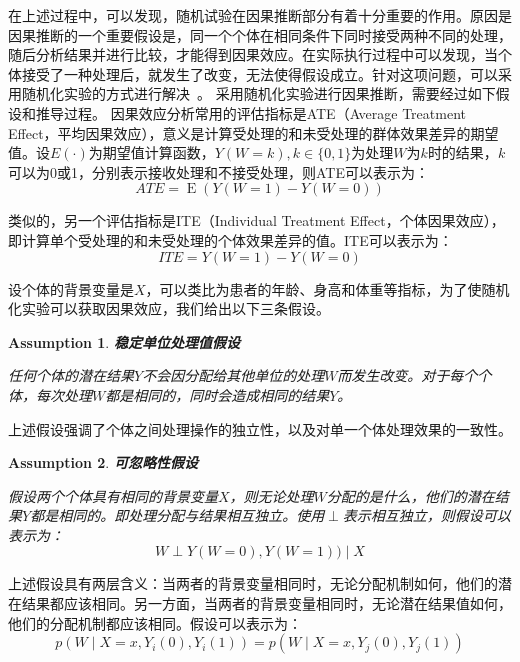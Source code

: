 \documentclass[algorithmlist, AutoFakeBold, AutoFakeSlant, figurelist, tablelist, nomlist, masters]{seuthesix}
\begin{document}
在上述过程中，可以发现，随机试验在因果推断部分有着十分重要的作用。原因是因果推断的一个重要假设是，同一个个体在相同条件下同时接受两种不同的处理，随后分析结果并进行比较，才能得到因果效应。在实际执行过程中可以发现，当个体接受了一种处理后，就发生了改变，无法使得假设成立。针对这项问题，可以采用随机化实验的方式进行解决~\cite{yao2021survey}。
采用随机化实验进行因果推断，需要经过如下假设和推导过程。
因果效应分析常用的评估指标是ATE（Average Treatment Effect，平均因果效应），意义是计算受处理的和未受处理的群体效果差异的期望值。设$E(\cdot)$为期望值计算函数，$Y(W=k), k \in \{0, 1\}$为处理$W$为$k$时的结果，$k$可以为0或1，分别表示接收处理和不接受处理，则ATE可以表示为：
\begin{equation}
  ATE=\operatorname{E}\left(Y(W=1) - Y(W=0)\right)
  \label{equation_ATE}
\end{equation}

类似的，另一个评估指标是ITE（Individual Treatment Effect，个体因果效应），即计算单个受处理的和未受处理的个体效果差异的值。ITE可以表示为：
\begin{equation}
  ITE=Y(W=1) - Y(W=0)
  \label{equation_ITE}
\end{equation}

设个体的背景变量是$X$，可以类比为患者的年龄、身高和体重等指标，为了使随机化实验可以获取因果效应，我们给出以下三条假设。
\newtheorem{assumption}{Assumption}[section]
\begin{assumption}
  \textbf{稳定单位处理值假设}

  任何个体的潜在结果$Y$不会因分配给其他单位的处理$W$而发生改变。对于每个个体，每次处理$W$都是相同的，同时会造成相同的结果$Y$。
\end{assumption}
上述假设强调了个体之间处理操作的独立性，以及对单一个体处理效果的一致性。

\begin{assumption}
  \textbf{可忽略性假设}

  假设两个个体具有相同的背景变量$X$，则无论处理$W$分配的是什么，他们的潜在结果$Y$都是相同的。即处理分配与结果相互独立。使用$\perp$表示相互独立，则假设可以表示为：
  \begin{equation}
    W \perp Y(W=0), Y(W=1)) \mid X
  \end{equation}
\end{assumption}
上述假设具有两层含义：当两者的背景变量相同时，无论分配机制如何，他们的潜在结果都应该相同。另一方面，当两者的背景变量相同时，无论潜在结果值如何，他们的分配机制都应该相同。假设可以表示为：
\begin{equation}
  p\left(W \mid X=x, Y_i(0), Y_i(1)\right)=p\left(W \mid X=x, Y_j(0), Y_j(1)\right)
\end{equation}
\end{document}
